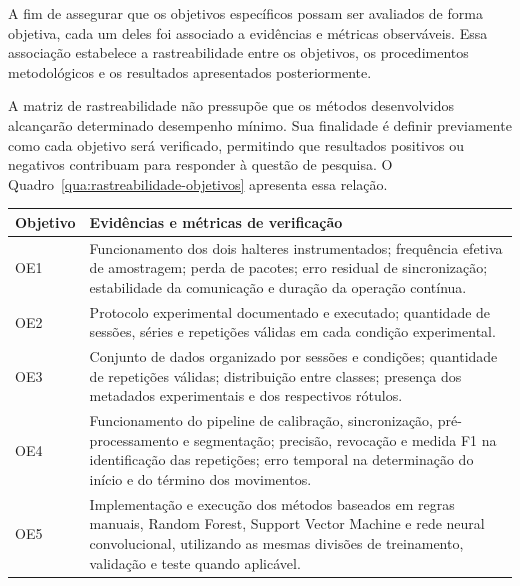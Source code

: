 A fim de assegurar que os objetivos específicos possam ser avaliados de
forma objetiva, cada um deles foi associado a evidências e métricas
observáveis. Essa associação estabelece a rastreabilidade entre os
objetivos, os procedimentos metodológicos e os resultados apresentados
posteriormente.

A matriz de rastreabilidade não pressupõe que os métodos desenvolvidos
alcançarão determinado desempenho mínimo. Sua finalidade é definir
previamente como cada objetivo será verificado, permitindo que resultados
positivos ou negativos contribuam para responder à questão de pesquisa.
O Quadro~\ref{qua:rastreabilidade-objetivos} apresenta essa relação.

\begin{quadro}[htb]
    \caption{Matriz de rastreabilidade dos objetivos específicos}
    \label{qua:rastreabilidade-objetivos}
    \centering
    \small
    \begin{tabular}{|p{}|p{}|}
        \hline
        \textbf{Objetivo} & \textbf{Evidências e métricas de verificação} \\
        \hline

        OE1 &
        Funcionamento dos dois halteres instrumentados; frequência efetiva
        de amostragem; perda de pacotes; erro residual de sincronização;
        estabilidade da comunicação e duração da operação contínua.
        \\
        \hline

        OE2 &
        Protocolo experimental documentado e executado; quantidade de
        sessões, séries e repetições válidas em cada condição experimental.
        \\
        \hline

        OE3 &
        Conjunto de dados organizado por sessões e condições; quantidade de
        repetições válidas; distribuição entre classes; presença dos
        metadados experimentais e dos respectivos rótulos.
        \\
        \hline

        OE4 &
        Funcionamento do pipeline de calibração, sincronização,
        pré-processamento e segmentação; precisão, revocação e medida F1
        na identificação das repetições; erro temporal na determinação do
        início e do término dos movimentos.
        \\
        \hline

        OE5 &
        Implementação e execução dos métodos baseados em regras manuais,
        Random Forest, Support Vector Machine e rede neural convolucional,
        utilizando as mesmas divisões de treinamento, validação e teste
        quando aplicável.
        \\
        \hline


\end{tabular}
\end{quadro}
